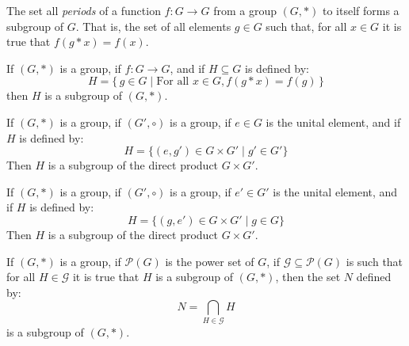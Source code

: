         The set all \textit{periods} of a function $f:G\rightarrow{G}$ from a
        group $(G,*)$ to itself forms a subgroup of $G$. That is, the set of
        all elements $g\in{G}$ such that, for all $x\in{G}$ it is true that
        $f(g*x)=f(x)$.
        \begin{theorem}
            If $(G,*)$ is a group, if $f:G\rightarrow{G}$, and if
            $H\subseteq{G}$ is defined by:
            \begin{equation}
                H=\{\,g\in{G}\;|\;\textrm{For all }x\in{G},f(g*x)=f(g)\,\}
            \end{equation}
            then $H$ is a subgroup of $(G,*)$.
        \end{theorem}
        \begin{theorem}
            If $(G,*)$ is a group, if $(G',\circ)$ is a group, if $e\in{G}$ is
            the unital element, and if $H$ is defined by:
            \begin{equation}
                H=\{(e,g')\in{G}\times{G}'\;|\;g'\in{G}'\}
            \end{equation}
            Then $H$ is a subgroup of the direct product $G\times{G}'$.
        \end{theorem}
        \begin{theorem}
            If $(G,*)$ is a group, if $(G',\circ)$ is a group, if $e'\in{G}'$ is
            the unital element, and if $H$ is defined by:
            \begin{equation}
                H=\{(g,e')\in{G}\times{G}'\;|\;g\in{G}\}
            \end{equation}
            Then $H$ is a subgroup of the direct product $G\times{G}'$.
        \end{theorem}
        \begin{theorem}
            If $(G,*)$ is a group, if $\mathcal{P}(G)$ is the power set of $G$,
            if $\mathcal{G}\subseteq\mathcal{P}(G)$ is such that for all
            $H\in\mathcal{G}$ it is true that $H$ is a subgroup of $(G,*)$, then
            the set $N$ defined by:
            \begin{equation}
                N=\bigcap_{H\in\mathcal{G}}H
            \end{equation}
            is a subgroup of $(G,*)$.
        \end{theorem}
